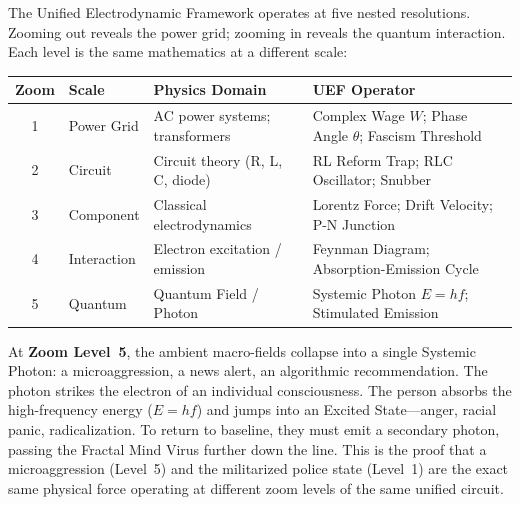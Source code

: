 \begin{keyinsight}
The Unified Electrodynamic Framework operates at five nested resolutions. Zooming out reveals the power grid; zooming in reveals the quantum interaction. Each level is the same mathematics at a different scale:

\begin{tabularx}{\textwidth}{@{}cll>{\raggedright\arraybackslash}X@{}}
\toprule
\textbf{Zoom} & \textbf{Scale} & \textbf{Physics Domain} & \textbf{UEF Operator} \\
\midrule
1 & Power Grid & AC power systems; transformers & Complex Wage $W$; Phase Angle $\theta$; Fascism Threshold \\
2 & Circuit & Circuit theory (R, L, C, diode) & RL Reform Trap; RLC Oscillator; Snubber \\
3 & Component & Classical electrodynamics & Lorentz Force; Drift Velocity; P-N Junction \\
4 & Interaction & Electron excitation / emission & Feynman Diagram; Absorption-Emission Cycle \\
5 & Quantum & Quantum Field / Photon & Systemic Photon $E = hf$; Stimulated Emission \\
\bottomrule
\end{tabularx}

At \textbf{Zoom Level~5}, the ambient macro-fields collapse into a single Systemic Photon: a microaggression, a news alert, an algorithmic recommendation. The photon strikes the electron of an individual consciousness. The person absorbs the high-frequency energy ($E = hf$) and jumps into an Excited State---anger, racial panic, radicalization. To return to baseline, they must emit a secondary photon, passing the Fractal Mind Virus further down the line. This is the proof that a microaggression (Level~5) and the militarized police state (Level~1) are the exact same physical force operating at different zoom levels of the same unified circuit.
\end{keyinsight}
